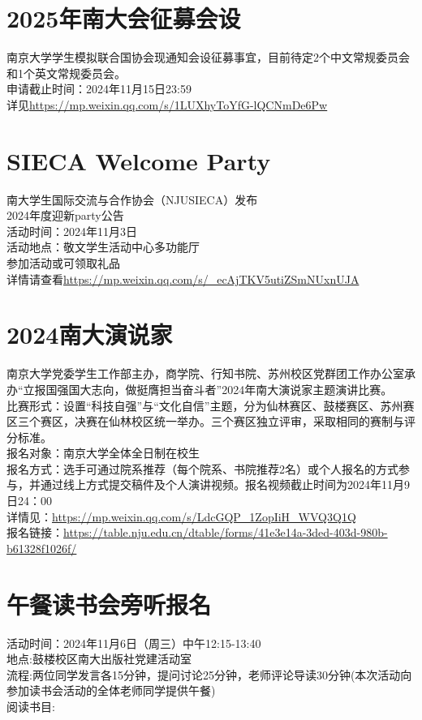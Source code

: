 \documentclass[letterpaper, 12pt]{article}
\begin{document}
\begin{multicols}{2}
\section{2025年南大会征募会设}
南京大学学生模拟联合国协会现通知会设征募事宜，目前待定2个中文常规委员会和1个英文常规委员会。\\
申请截止时间：2024年11月15日23:59\\
详见\url{https://mp.weixin.qq.com/s/1LUXhyToYfG-lQCNmDe6Pw}

\section{SIECA Welcome Party}
南大学生国际交流与合作协会（NJUSIECA）发布\\
2024年度迎新party公告\\
活动时间：2024年11月3日\\
活动地点：敬文学生活动中心多功能厅\\
参加活动或可领取礼品\\
详情请查看\url{https://mp.weixin.qq.com/s/_ecAjTKV5utiZSmNUxnUJA}
\section{2024南大演说家}
南京大学党委学生工作部主办，商学院、行知书院、苏州校区党群团工作办公室承办“立报国强国大志向，做挺膺担当奋斗者”2024年南大演说家主题演讲比赛。\\
比赛形式：设置“科技自强”与“文化自信”主题，分为仙林赛区、鼓楼赛区、苏州赛区三个赛区，决赛在仙林校区统一举办。三个赛区独立评审，采取相同的赛制与评分标准。\\
报名对象：南京大学全体全日制在校生\\
报名方式：选手可通过院系推荐（每个院系、书院推荐2名）或个人报名的方式参与，并通过线上方式提交稿件及个人演讲视频。报名视频截止时间为2024年11月9日24：00\\
详情见：\url{https://mp.weixin.qq.com/s/LdcGQP_1ZopIiH_WVQ3Q1Q}\\
报名链接：\url{https://table.nju.edu.cn/dtable/forms/41e3e14a-3ded-403d-980b-b61328f1026f/}
\section{午餐读书会旁听报名}
活动时间：2024年11月6日（周三）中午12:15-13:40\\
地点:鼓楼校区南大出版社党建活动室\\
流程:两位同学发言各15分钟，提问讨论25分钟，老师评论导读30分钟(本次活动向参加读书会活动的全体老师同学提供午餐)\\
阅读书目:


\end{multicols}
\end{document}
